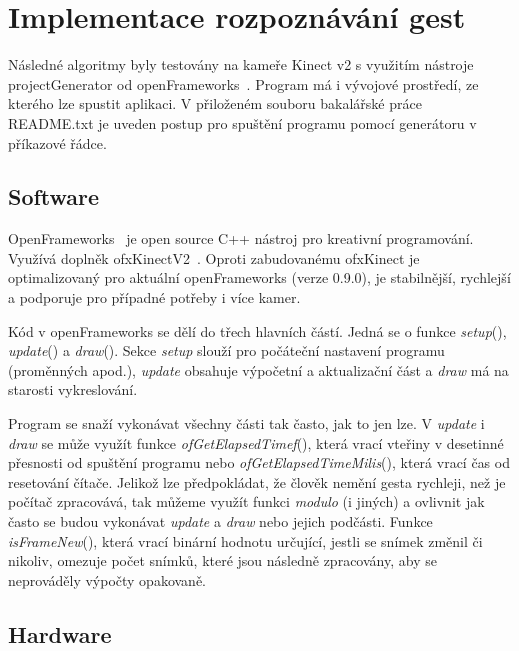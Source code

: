 \chapter{Implementace rozpoznávání gest}
Následné algoritmy byly testovány na kameře Kinect v2 s využitím nástroje  projectGenerator od openFrameworks~\cite{1}. Program má i vývojové prostředí, ze kterého lze spustit aplikaci. V přiloženém souboru bakalářské práce README.txt je uveden postup pro spuštění programu pomocí generátoru v příkazové řádce.

\section{Software}

OpenFrameworks~\cite{1} je open source C++ nástroj pro kreativní programování. Využívá doplněk ofxKinectV2~\cite{2}. Oproti zabudovanému ofxKinect je optimalizovaný pro aktuální openFrameworks (verze 0.9.0), je stabilnější, rychlejší a podporuje pro případné potřeby i více kamer.

Kód v openFrameworks se dělí do třech hlavních částí. Jedná se o funkce \textit{setup}(), \textit{update}() a \textit{draw}(). Sekce \textit{setup} slouží pro počáteční nastavení programu (proměnných apod.), \textit{update} obsahuje výpočetní a aktualizační část a \textit{draw} má na starosti vykreslování.

Program se snaží vykonávat všechny části tak často, jak to jen lze. V \textit{update} i \textit{draw} se může využít funkce \textit{ofGetElapsedTimef}(), která vrací vteřiny v desetinné přesnosti od spuštění programu nebo \textit{ofGetElapsedTimeMilis}(), která vrací čas od resetování čítače. Jelikož lze předpokládat, že člověk nemění gesta rychleji, než je počítač zpracovává, tak můžeme využít funkci \textit{modulo} (i jiných) a ovlivnit jak často se budou vykonávat \textit{update} a \textit{draw} nebo jejich podčásti. Funkce \textit{isFrameNew}(), která vrací binární hodnotu určující, jestli se snímek změnil či nikoliv, omezuje počet snímků, které jsou následně zpracovány, aby se neprováděly výpočty opakovaně.


\section{Hardware}

